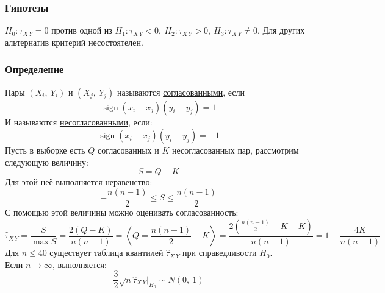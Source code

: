 \documentclass[12pt, a4paper]{article}
\DeclareMathOperator{\sign}{sign}
\begin{document}
\subsubsection*{Гипотезы}
$H_0: \tau_{X\, Y} = 0$ против одной из $H_1: \tau_{X\, Y} < 0,\ H_2: \tau_{X\, Y} > 0,\ H_3: \tau_{X\, Y} \neq 0$. Для других альтернатив критерий несостоятелен.
\subsubsection*{Определение}
Пары $(X_i,\ Y_i)$ и $(X_j,\ Y_j)$ называются \underline{согласованными}, если
\[\sign (x_i - x_j)(y_i - y_j) = 1\]
И называются \underline{несогласованными}, если:
\[\sign (x_i - x_j)(y_i - y_j) = -1\]
Пусть в выборке есть $Q$ согласованных и $K$ несогласованных пар, рассмотрим следующую величину:
\[
S = Q - K
\]
Для этой неё выполняется неравенство:
\[
-\frac{n(n - 1)}{2} \leq S \leq \frac{n(n - 1)}{2}
\]
С помощью этой величины можно оценивать согласованность:
\[\hat \tau_{X\, Y} = \frac{S}{\max S} = \frac{2 (Q - K)}{n(n - 1)} = \left<Q = \frac{n(n - 1)}{2} - K \right> = \frac{2\left( \frac{n(n - 1)}{2} - K - K \right)}{n(n - 1)} = 1 - \frac{4K}{n(n - 1)}\]
Для $n \leq 40$ существует таблица квантилей $\hat \tau_{X\, Y}$ при справедливости $H_0$.\\
Если $n \to \infty$, выполняется:
\[\frac{3}{2}\sqrt{n} \hat \tau_{X\, Y}\Big|_{H_0} \sim N(0,\ 1)\]
\end{document}
